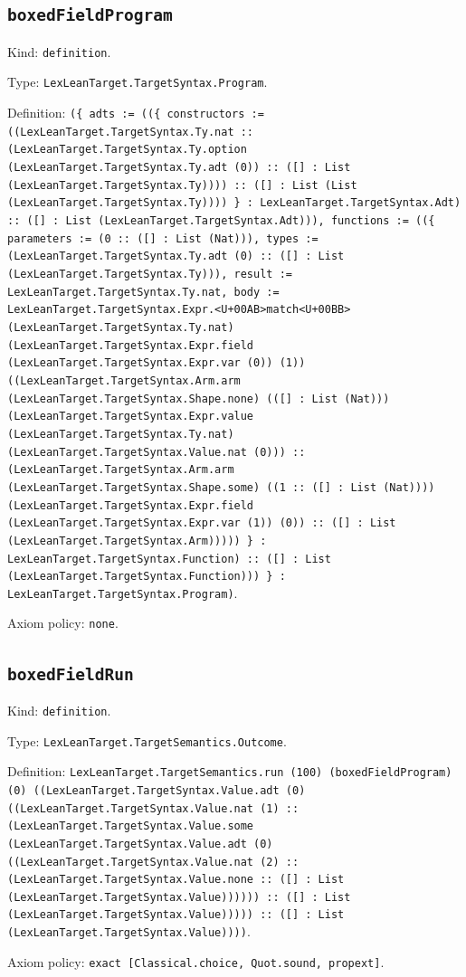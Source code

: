 \documentclass[11pt]{article}
\begin{document}
\subsection*{\texttt{boxedFieldProgram}}
\noindent Kind: \texttt{definition}.\par
\noindent Type: \texttt{LexLeanTarget.TargetSyntax.Program}.\par
\noindent Definition: \texttt{(\{ adts := ((\{ constructors := ((LexLeanTarget.TargetSyntax.Ty.nat :: (LexLeanTarget.TargetSyntax.Ty.option (LexLeanTarget.TargetSyntax.Ty.adt (0)) :: ([] : List (LexLeanTarget.TargetSyntax.Ty)))) :: ([] : List (List (LexLeanTarget.TargetSyntax.Ty)))) \} : LexLeanTarget.TargetSyntax.Adt) :: ([] : List (LexLeanTarget.TargetSyntax.Adt))), functions := ((\{ parameters := (0 :: ([] : List (Nat))), types := (LexLeanTarget.TargetSyntax.Ty.adt (0) :: ([] : List (LexLeanTarget.TargetSyntax.Ty))), result := LexLeanTarget.TargetSyntax.Ty.nat, body := LexLeanTarget.TargetSyntax.Expr.<U+00AB>match<U+00BB> (LexLeanTarget.TargetSyntax.Ty.nat) (LexLeanTarget.TargetSyntax.Expr.field (LexLeanTarget.TargetSyntax.Expr.var (0)) (1)) ((LexLeanTarget.TargetSyntax.Arm.arm (LexLeanTarget.TargetSyntax.Shape.none) (([] : List (Nat))) (LexLeanTarget.TargetSyntax.Expr.value (LexLeanTarget.TargetSyntax.Ty.nat) (LexLeanTarget.TargetSyntax.Value.nat (0))) :: (LexLeanTarget.TargetSyntax.Arm.arm (LexLeanTarget.TargetSyntax.Shape.some) ((1 :: ([] : List (Nat)))) (LexLeanTarget.TargetSyntax.Expr.field (LexLeanTarget.TargetSyntax.Expr.var (1)) (0)) :: ([] : List (LexLeanTarget.TargetSyntax.Arm))))) \} : LexLeanTarget.TargetSyntax.Function) :: ([] : List (LexLeanTarget.TargetSyntax.Function))) \} : LexLeanTarget.TargetSyntax.Program)}.\par
\noindent Axiom policy: \texttt{none}.\par
\subsection*{\texttt{boxedFieldRun}}
\noindent Kind: \texttt{definition}.\par
\noindent Type: \texttt{LexLeanTarget.TargetSemantics.Outcome}.\par
\noindent Definition: \texttt{LexLeanTarget.TargetSemantics.run (100) (boxedFieldProgram) (0) ((LexLeanTarget.TargetSyntax.Value.adt (0) ((LexLeanTarget.TargetSyntax.Value.nat (1) :: (LexLeanTarget.TargetSyntax.Value.some (LexLeanTarget.TargetSyntax.Value.adt (0) ((LexLeanTarget.TargetSyntax.Value.nat (2) :: (LexLeanTarget.TargetSyntax.Value.none :: ([] : List (LexLeanTarget.TargetSyntax.Value)))))) :: ([] : List (LexLeanTarget.TargetSyntax.Value))))) :: ([] : List (LexLeanTarget.TargetSyntax.Value))))}.\par
\noindent Axiom policy: \texttt{exact [Classical.choice, Quot.sound, propext]}.\par
\end{document}

